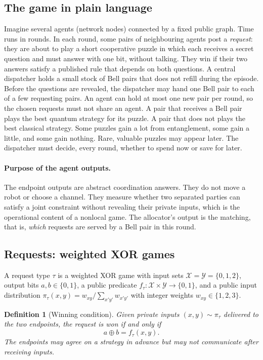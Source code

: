 \documentclass[11pt,a4paper]{article}
\newcommand{\xor}{\mathbin{\oplus}}
\newtheorem{definition}{Definition}
\begin{document}
\subsection{The game in plain language}\label{sec:plain}

Imagine several agents (network nodes) connected by a fixed public graph. Time runs in rounds. In each round, some pairs of neighbouring agents post a \emph{request}: they are about to play a short cooperative puzzle in which each receives a secret question and must answer with one bit, without talking. They win if their two answers satisfy a published rule that depends on both questions. A central dispatcher holds a small stock of Bell pairs that does not refill during the episode. Before the questions are revealed, the dispatcher may hand one Bell pair to each of a few requesting pairs. An agent can hold at most one new pair per round, so the chosen requests must not share an agent. A pair that receives a Bell pair plays the best quantum strategy for its puzzle. A pair that does not plays the best classical strategy. Some puzzles gain a lot from entanglement, some gain a little, and some gain nothing. Rare, valuable puzzles may appear later. The dispatcher must decide, every round, whether to spend now or save for later.

\paragraph{Purpose of the agent outputs.} The endpoint outputs are abstract coordination answers. They do not move a robot or choose a channel. They measure whether two separated parties can satisfy a joint constraint without revealing their private inputs, which is the operational content of a nonlocal game. The allocator's output is the matching, that is, \emph{which} requests are served by a Bell pair in this round.

\subsection{Requests: weighted XOR games}\label{sec:requests}

A request type $\tau$ is a weighted XOR game with input sets $\mathcal{X}=\mathcal{Y}=\{0,1,2\}$, output bits $a,b\in\{0,1\}$, a public predicate $f_\tau:\mathcal{X}\times\mathcal{Y}\to\{0,1\}$, and a public input distribution $\pi_\tau(x,y)=w_{xy}/\sum_{x'y'}w_{x'y'}$ with integer weights $w_{xy}\in\{1,2,3\}$.

\begin{definition}[Winning condition]\label{def:win}
Given private inputs $(x,y)\sim\pi_\tau$ delivered to the two endpoints, the request is \emph{won} if and only if
\begin{equation}
  a \xor b = f_\tau(x,y).
  \label{eq:win}
\end{equation}
The endpoints may agree on a strategy in advance but may not communicate after receiving inputs.
\end{definition}
\end{document}
